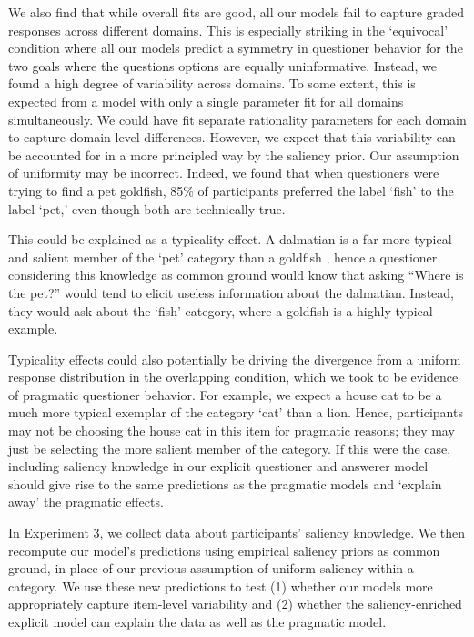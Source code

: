 \documentclass[12pt, floatsintext, jou]{apa6}
\begin{document}
We also find that while overall fits are good, all our models fail to capture graded responses across different domains. This is especially striking in the `equivocal' condition where all our models predict a symmetry in questioner behavior for the two goals where the questions options are equally uninformative. Instead, we found a high degree of variability across domains. To some extent, this is expected from a model with only a single parameter fit for all domains simultaneously. We could have fit separate rationality parameters for each domain to capture domain-level differences. However, we expect that this variability can be accounted for in a more principled way by the saliency prior. Our assumption of uniformity may be incorrect. Indeed, we found that when questioners were trying to find a pet goldfish, 85\% of participants preferred the label `fish' to the label `pet,' even though both are technically true. 

This could be explained as a typicality effect. A dalmatian is a far more typical and salient member of the `pet' category than a goldfish \cite{Rosch75}, hence a questioner considering this knowledge as common ground would know that asking ``Where is the pet?'' would tend to elicit useless information about the dalmatian. Instead, they would ask about the `fish' category, where a goldfish is a highly typical example. 

Typicality effects could also potentially be driving the divergence from a uniform response distribution in the overlapping condition, which we took to be evidence of pragmatic questioner behavior. For example, we expect a house cat to be a much more typical exemplar of the category `cat' than a lion. Hence, participants may not be choosing the house cat in this item for pragmatic reasons; they may just be selecting the more salient member of the category. If this were the case, including saliency knowledge in our explicit questioner and answerer model should give rise to the same predictions as the pragmatic models and `explain away' the pragmatic effects.

In Experiment 3, we collect data about participants' saliency knowledge. We then recompute our model's predictions using empirical saliency priors as common ground, in  place of our previous assumption of uniform saliency within a category. We use these new predictions to test (1) whether our models more appropriately capture item-level variability and (2) whether the saliency-enriched explicit model can explain the data as well as the pragmatic model.
\end{document}
